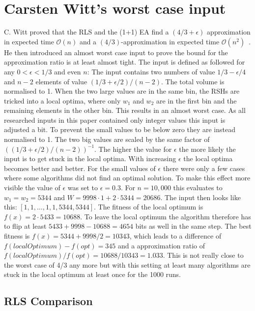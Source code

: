 \section{Carsten Witt's worst case input}
C. Witt proved that the RLS and the (1+1) EA find a $(4/3+\epsilon)$ approximation in expected time $\mathcal{O}(n)$ and a $(4/3)$-approximation in expected time $\mathcal{O}(n^2)$~\cite{diekert2005stacs}.
He then introduced an almost worst case input to prove the bound for the approximation ratio is at least almost tight.
The input is defined as followed for any $0<\epsilon<1/3$ and even $n$:\newline
The input contains two numbers of value $1/3 - \epsilon/4$ and $n-2$ elements of value $(1/3+\epsilon/2)/(n-2)$. 
The total volume is normalised to 1.
When the two large values are in the same bin, the RSHs are tricked into a local optima, where only $w_1$ and $w_2$ are in the first bin and the remaining elements in the other bin.
This results in an almost worst case.
As all researched inputs in this paper contained only integer values this input is adjusted a bit.
To prevent the small values to be below zero they are instead normalised to 1.
The two big values are scaled by the same factor of $((1/3+\epsilon/2)/(n-2))^{-1}$.
The higher the value for $\epsilon$ the more likely the input is to get stuck in the local optima.
With increasing $\epsilon$ the local optima becomes better and better.
For the small values of $\epsilon$ there were only a few cases where some algorithms did not find an optimal solution.
To make this effect more visible the value of $\epsilon$ was set to $\epsilon=0.3$.\newline
For $n=10,000$ this evaluates to $w_1=w_2=5344$ and $W=9998 \cdot 1 + 2 \cdot 5344 = 20686$.
The input then looks like this: $[1, 1, \dots, 1, 1, 5344, 5344]$.
The fitness of the local optimum is $f(x) = 2 \cdot 5433 = 10688$.
To leave the local optimum the algorithm therefore has to flip at least  $5433+9998-10688 = 4654$ bits as well in the same step.
The best fitness is $f(x) = 5344 + 9998/2 = 10343$, which leads to a difference of $f(localOptimum)-f(opt) = 345$ and a approximation ratio of $f(localOptimum)/f(opt)=10688/10343=1.033$.
This is not really close to the worst case of 4/3 any more but with this setting at least many algorithms are stuck in the local optimum at least once for the 1000 runs.
\subsection{RLS Comparison}


